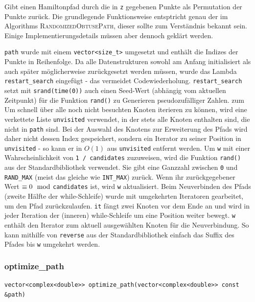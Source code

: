 \documentclass[a4paper, 10pt, ngerman]{article}
\begin{document}
\noindent Gibt einen Hamiltonpfad durch die in \verb|z| gegebenen Punkte als Permutation der Punkte zurück. Die grundlegende Funktionsweise entsptricht genau der im Algorithms \textsc{RandomizedObtusePath}, dieser sollte zum Verständnis bekannt sein. Einige Implementierungsdetails müssen aber dennoch geklärt werden.

\verb|path| wurde mit einem \verb|vector<size_t>| umgesetzt und enthält die Indizes der Punkte in Reihenfolge. Da alle Datenstrukturen sowohl am Anfang initialisiert als auch später möglicherweise zurückgesetzt werden müssen, wurde das Lambda \verb|restart_search| eingefügt - das vermeidet Codewiederholung. \verb|restart_search| setzt mit \verb|srand(time(0))| auch einen Seed-Wert (abhängig vom aktuellen Zeitpunkt) für die Funktion \verb|rand()| zu Generieren pseudozufälliger Zahlen. zum Um schnell über alle noch nicht besuchten Knoten iterieren zu können, wird eine verkettete Liste \verb|unvisited| verwendet, in der stets alle Knoten enthalten sind, die nicht in \verb|path| sind. Bei der Auswahl des Knotens zur Erweiterung des Pfads wird daher nicht dessen Index gespeichert, sondern ein Iterator zu seiner Position in \verb|unvisited| - so kann er in $O(1)$ aus \verb|unvisited| entfernt werden. Um \verb|w| mit einer Wahrscheinlichkeit von \verb|1 / candidates| zuzuweisen, wird die Funktion \verb|rand()| aus der Standardbibliothek verwendet. Sie gibt eine Ganzzahl zwischen \verb|0| und \verb|RAND_MAX| (meist das gleiche wie \verb|INT_MAX|) zurück. Wenn ihr zurückgegebener Wert $\equiv 0 \mod$\verb|candidates| ist, wird \verb|w| aktualisiert. Beim Neuverbinden des Pfads (zweite Hälfte der while-Schleife) wurde mit umgekehrten Iteratoren gearbeitet, um den Pfad zurückzulaufen. \verb|it| fängt zwei Knoten vor dem Ende an und wird in jeder Iteration der (inneren) while-Schleife um eine Position weiter bewegt. \verb|w| enthält den Iterator zum aktuell ausgewählten Knoten für die Neuverbindung. So kann mithilfe von \verb|reverse| aus der Standardbibliothek einfach das Suffix des Pfades bis \verb|w| umgekehrt werden.

\subsubsection{optimize\_path}

\verb|vector<complex<double>> optimize_path(vector<complex<double>> const &path)|
\medskip
\end{document}
